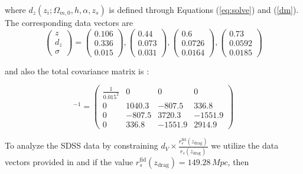 \documentclass[universe,article,accept,moreauthors,pdftex]{Definitions/mdpi}
\begin{document}
where  $d_{z}(z_{i};\Omega_{m,0},h,\alpha,z_{s})$ is defined through  Equations (\ref{eq:solve}) and (\ref{dm}). The corresponding data vectors are \cite{Theodoropoulos:2021hkk}
\begin{equation*}
\begin{pmatrix}
z \\
d_{z} \\
\sigma
\end{pmatrix}=\begin{pmatrix}
0.106 \\
0.336 \\
0.015
\end{pmatrix},\begin{pmatrix}
0.44 \\
0.073 \\
0.031
\end{pmatrix},\begin{pmatrix}
0.6 \\
0.0726 \\
0.0164
\end{pmatrix},\begin{pmatrix}
0.73 \\
0.0592 \\
0.0185
\end{pmatrix}
\end{equation*}

and also the total covariance matrix is \cite{Theodoropoulos:2021hkk}:

 \begin{equation}
 [C_{6dFGs,Wiggle}]^{-1}=
 \begin{pmatrix}
  \frac{1}{0.015^{2}} & 0 & 0 &0 \\
  0 & 1040.3 &  -807.5 & 336.8 \\
  0  & -807.5& 3720.3 & -1551.9   \\
 0  & 336.8& -1551.9 & 2914.9   
 \end{pmatrix}
 \end{equation}



 
 
To analyze the SDSS data by constraining  $d_{V}\times \frac{r_{s}^{\text{fid}}(z_{\text{drag}})}{r_{s}(z_{\text{drag}})}$ we utilize the data vectors provided in \cite{Theodoropoulos:2021hkk} and if the value $r_{s}^{\text{fid}}(z_{\text{drag}})=149.28 \,Mpc$, then
\end{document}
